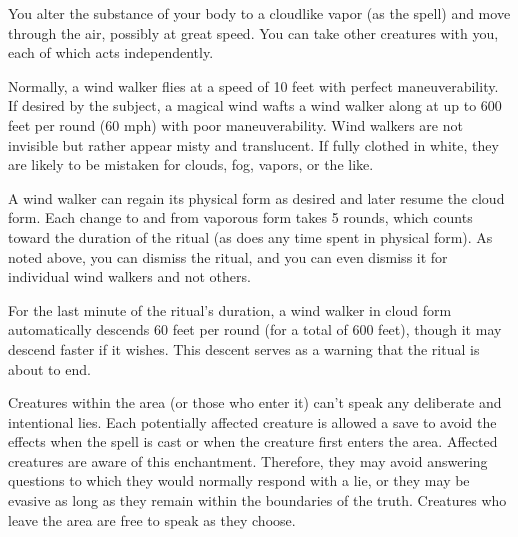 \begin{spelleffect}
\par You alter the substance of your body to a cloudlike vapor (as the  spell) and move through the air, possibly at great speed. You can take other creatures with you, each of which acts independently.
\par Normally, a wind walker flies at a speed of 10 feet with perfect maneuverability. If desired by the subject, a magical wind wafts a wind walker along at up to 600 feet per round (60 mph) with poor maneuverability. Wind walkers are not invisible but rather appear misty and translucent. If fully clothed in white, they are likely to be mistaken for clouds, fog, vapors, or the like.
\par A wind walker can regain its physical form as desired and later resume the cloud form. Each change to and from vaporous form takes 5 rounds, which counts toward the duration of the ritual (as does any time spent in physical form). As noted above, you can dismiss the ritual, and you can even dismiss it for individual wind walkers and not others.
\par For the last minute of the ritual's duration, a wind walker in cloud form automatically descends 60 feet per round (for a total of 600 feet), though it may descend faster if it wishes. This descent serves as a warning that the ritual is about to end.
\end{spelleffect}

\spellrng{\rngmed}
\spelldur{\durmed}
\begin{spelleffect}
  Creatures within the area (or those who enter it) can't speak any deliberate and intentional lies. Each potentially affected creature is allowed a save to avoid the effects when the spell is cast or when the creature first enters the area. Affected creatures are aware of this enchantment. Therefore, they may avoid answering questions to which they would normally respond with a lie, or they may be evasive as long as they remain within the boundaries of the truth. Creatures who leave the area are free to speak as they choose.
\end{spelleffect}
